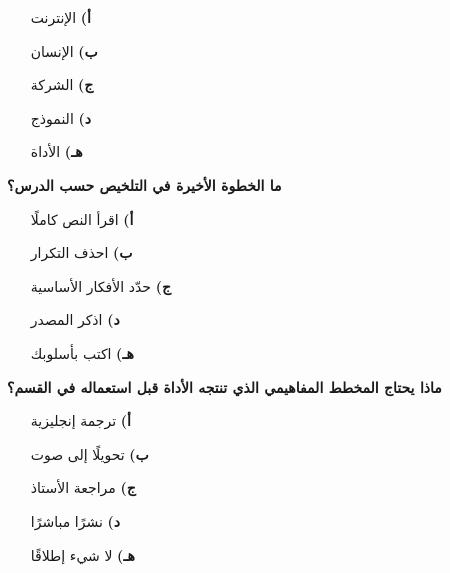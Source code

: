 \documentclass[11pt,a4paper]{article}
\begin{document}
\begin{multicols}{2}
\begin{minipage}{\linewidth}
\begin{itemize}[leftmargin=0.95cm, labelsep=4pt, itemsep=0pt, topsep=2pt, parsep=0pt]
  \item[\textbf{أ)}] الإنترنت
  \item[\textbf{ب)}] الإنسان
  \item[\textbf{ج)}] الشركة
  \item[\textbf{د)}] النموذج
  \item[\textbf{هـ)}] الأداة
\end{itemize}
\end{minipage}\par\vspace{7pt plus 4pt}
\noindent\begin{minipage}{\linewidth}
\hangindent=0.7cm\textbf{ما الخطوة الأخيرة في التلخيص حسب الدرس؟}
\begin{itemize}[leftmargin=0.95cm, labelsep=4pt, itemsep=0pt, topsep=2pt, parsep=0pt]
  \item[\textbf{أ)}] اقرأ النص كاملًا
  \item[\textbf{ب)}] احذف التكرار
  \item[\textbf{ج)}] حدّد الأفكار الأساسية
  \item[\textbf{د)}] اذكر المصدر
  \item[\textbf{هـ)}] اكتب بأسلوبك
\end{itemize}
\end{minipage}\par\vspace{7pt plus 4pt}
\noindent\begin{minipage}{\linewidth}
\hangindent=0.7cm\textbf{ماذا يحتاج المخطط المفاهيمي الذي تنتجه الأداة قبل استعماله في القسم؟}
\begin{itemize}[leftmargin=0.95cm, labelsep=4pt, itemsep=0pt, topsep=2pt, parsep=0pt]
  \item[\textbf{أ)}] ترجمة إنجليزية
  \item[\textbf{ب)}] تحويلًا إلى صوت
  \item[\textbf{ج)}] مراجعة الأستاذ
  \item[\textbf{د)}] نشرًا مباشرًا
  \item[\textbf{هـ)}] لا شيء إطلاقًا
\end{itemize}
\end{minipage}\par\vspace{7pt plus 4pt}
\noindent\begin{minipage}{\linewidth}

\end{minipage}
\end{multicols}
\end{document}
